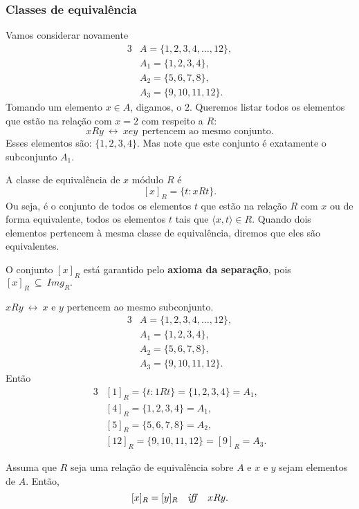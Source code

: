 \subsubsection{Classes de equivalência}\label{subsubsec: CEQ}
  Vamos considerar novamente
    \begin{alignat*}{3}
      &A = \{1,2,3,4, \dots , 12\},\\
      &A_{1} = \{1,2,3,4\},\\
      &A_{2} = \{5,6,7,8\},\\
      &A_{3} = \{9,10,11,12\}.
    \end{alignat*}
  Tomando um elemento $x \in A$, digamos, o $2$. Queremos listar todos os elementos que estão na relação com $x = 2$ com respeito a $R$:
  $$xRy\ \leftrightarrow\ x e y\ \ \textrm{pertencem\ ao\ mesmo\ conjunto.}$$
  Esses elementos são: $\{1,2,3,4\}.$ Mas note que este conjunto é exatamente o subconjunto $A_{1}$.
  \begin{definition}
    A classe de equivalência de $x$ módulo $R$ é
    $$[x]_{R} = \{t: xRt\}.$$
    Ou seja, é o conjunto de todos os elementos $t$ que estão na relação $R$ com $x$ ou de forma equivalente, todos os elementos $t$ tais que $\langle x, t \rangle \in R.$ Quando dois elementos pertencem à mesma classe de equivalência, diremos que eles são equivalentes.
  \end{definition}
  O conjunto $[x]_{R}$ está garantido pelo \textbf{axioma da separação}, pois $[x]_{R}\ \subseteq\ \mathit{Img}_{R}.$
    \begin{exmp}
      $xRy\ \leftrightarrow\ x$ e $y$ pertencem ao mesmo subconjunto.
        \begin{alignat*}{3}
          &A = \{1,2,3,4, \dots , 12\},\\
          &A_{1} = \{1,2,3,4\},\\
          &A_{2} = \{5,6,7,8\},\\
          &A_{3} = \{9,10,11,12\}.
        \end{alignat*}
      Então
        \begin{alignat*}{3}
          &[1]_{R} = \{t: 1Rt\} = \{1,2,3,4\} = A_{1},\\
          &[4]_{R} = \{1,2,3,4\} = A_{1},\\
          &[5]_{R} = \{5,6,7,8\} = A_{2},\\
          &[12]_{R} = \{9,10,11,12\} = [9]_{R} = A_{3}.
        \end{alignat*}
    \end{exmp}
\begin{theorem}
  Assuma que $R$ seja uma relação de equivalência sobre $A$ e $x$ e $y$ sejam elementos de $A$.
  Então,
  $$[x]_{R} = [y]_{R}\quad \textrm{\textit{iff}}\quad xRy.$$
\end{theorem}
